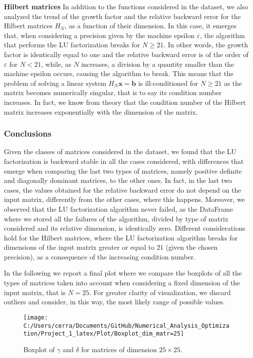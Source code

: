 \documentclass[a4paper,11pt]{report}
\begin{document}
\noindent \textbf{Hilbert matrices} In addition to the functions considered in the dataset, we also analyzed the trend of the growth factor and the relative backward error for the Hilbert matrices $H_{N}$, as a function of their dimension. In this case, it emerges that, when considering a precision given by the machine epsilon $\varepsilon$, the algorithm that performs the LU factorization breaks for $N\ge21$. In other words, the growth factor is identically equal to one and the relative backward error is of the order of $\varepsilon$ for $N<21$, while, as $N$ increases, a division by a quantity smaller than the machine epsilon occurs, causing the algorithm to break. This means that the problem of solving a linear system $H_{N}\textbf{x}=\textbf{b}$ is ill-conditioned for $N\ge21$ as the matrix becomes numerically singular, that is to say its condition number increases. In fact, we know from theory that the condition number of the Hilbert matrix increases exponentially with the dimension of the matrix.

\subsubsection{Conclusions}
Given the classes of matrices considered in the dataset, we found that the LU factorization is backward stable in all the cases considered, with differences that emerge when comparing the last two types of matrices, namely positive definite and diagonally dominant matrices, to the other ones. In fact, in the last two cases, the values obtained for the relative backward error do not depend on the input matrix, differently from the other cases, where this happens. Moreover, we observed that the LU factorization algorithm never failed, as the DataFrame where we stored all the failures of the algorithm, divided by type of matrix considered and its relative dimension, is identically zero. Different considerations hold for the Hilbert matrices, where the LU factorization algorithm breaks for dimensions of the input matrix greater or equal to $21$ (given the chosen precision), as a consequence of the increasing condition number.

\noindent In the following we report a final plot where we compare the boxplots of all the types of matrices taken into account when considering a fixed dimension of the input matrix, that is $N=25$. For greater clarity of visualization, we discard outliers and consider, in this way, the most likely range of possible values.

\begin{figure}[H]
	\centering
	\texttt{[image: C:/Users/cerra/Documents/GitHub/Numerical\_Analysis\_Optimization/Project\_1\_latex/Plot/Boxplot\_dim\_matr=25]}
	\caption{Boxplot of $\gamma$ and $\delta$ for matrices of dimension $25\times25$.}
	\label{fig:Boxplot_final}
\end{figure}
\end{document}

